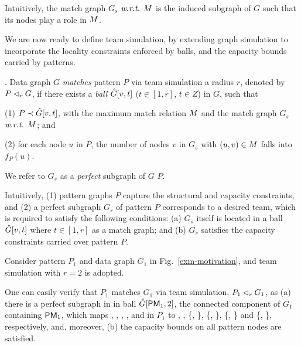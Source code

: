 Intuitively, the match graph $G_s$ $\emph{w.r.t.}$ $M$ is the induced subgraph of
$G$ such that its nodes play a role in $M$.



We are now ready to define team simulation, by extending graph simulation to incorporate the locality constraints enforced by balls, and the capacity bounds carried by patterns.

. Data graph $G$ {\em matches} pattern $P$  via
team simulation \wrt a radius $r$, denoted by $P \lhd_r G$, if
there exists a {\em ball} $\hat{G}{[v, t]}$ ($t \in [1,r]$, $t \in Z$) in $G$, such that

\vspace{0.5ex}
\ni(1) $P\prec \hat{G}{[v, t]}$, with the maximum match relation $M$ and the match graph $G_s$ $\emph{w.r.t.}$ $M$; and

\vspace{0.5ex}
\ni(2) for each node $u$ in $P$, the number of nodes $v$ in $G_s$  with $(u, v)\in M$ falls into $f_P(u)$.

\vspace{0.5ex}
We refer to  $G_s$ as a {\em perfect} subgraph of $G$ \wrt $P$.


Intuitively, (1) pattern graphs $P$ capture the structural and capacity constraints, and (2) a perfect subgraph $G_s$ of pattern $P$ corresponds to a desired team, which is required to satisfy the following conditions:
(a) $G_s$ itself is located in a ball $\hat{G}{[v, t]}$  where $t \in [1,r]$ as a match graph; and
(b) $G_s$ satisfies the capacity constraints carried over pattern $P$.



\begin{example}
\label{exm-rsimulation}
Consider pattern $P_1$ and data graph $G_1$ in Fig.~\ref{exm-motivation}, and  team simulation with $r=2$ is adopted.

One can easily verify that $P_1$ matches $G_1$  via team simulation, \ie $P_1 \lhd_r G_1$, 
as (a) there is a perfect subgraph in in ball
$\hat{G}{[{\mathsf{PM_1}}, 2]}$, \ie the connected component of $G_1$ containing ${\mathsf{PM_{1}}}$, which maps , , , ,  and  in $P_1$ to , , \{, \}, \{, \}, \{, \} and \{, \}, respectively, and, moreover, (b) the capacity bounds on all pattern nodes are satisfied.
\end{example}

